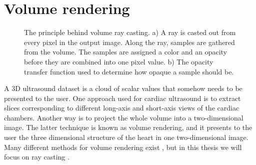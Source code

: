 \section{Volume rendering}\label{sec:volren}
\begin{figure}[t!]
\centering
{}
\caption{The principle behind volume ray casting. a) A ray is casted out from every pixel in the output image. Along the ray, samples are gathered from the volume. The samples are assigned a color and an opacity before they are combined into one pixel value. b) The opacity transfer function used to determine how opaque a sample should be.}
\label{fig:vr}
\end{figure}
A 3D ultrasound dataset is a cloud of scalar values that somehow needs to be presented to the user. One approach used for cardiac ultrasound  is to extract slices corresponding to different long-axis and short-axis views of the cardiac chambers. Another way is to project the whole volume into a two-dimensional image. The latter technique is known as volume rendering, and it presents to the user the three dimensional structure of the heart in one two-dimensional image. Many different methods for volume rendering exist \cite{brodlie2001}, but in this thesis we will focus on ray casting \cite{Levoy1988}. 

